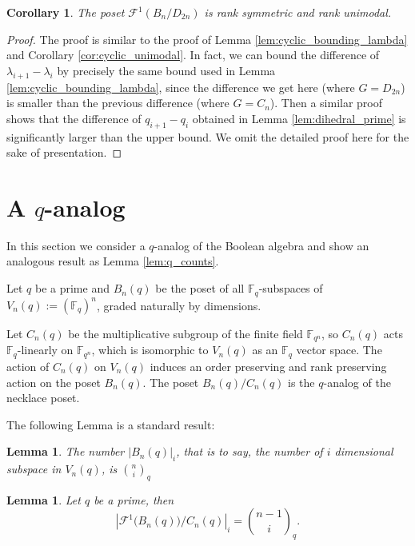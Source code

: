 \documentclass{amsart}
\newtheorem{cor}[thm]{Corollary}
\newtheorem{lem}[thm]{Lemma}
\theoremstyle{remark}
\newcommand\BF{{\mathbb F}}
\begin{document}
\begin{cor}{\label{dihedral003}} 
The poset $\mathcal F^1(B_n/D_{2n})$ is rank symmetric and rank unimodal.
\end{cor}

\begin{proof}
The proof is similar to the proof of Lemma \ref{lem:cyclic_bounding_lambda} and Corollary \ref{cor:cyclic_unimodal}. In fact, we can bound the difference of $\lambda_{i+1} - \lambda_i$ by precisely the same bound used in Lemma \ref{lem:cyclic_bounding_lambda}, since the difference we get here (where $G = D_{2n}$) is smaller than the previous difference (where $G= C_n$). Then a similar proof shows that the difference of $q_{i+1} - q_i$ obtained  in Lemma \ref{lem:dihedral_prime} is significantly larger than the upper bound. We omit the detailed proof here for the sake of presentation.
\end{proof}


\section{A $q$-analog}
\label{sec:q_analog}

In this section we consider a $q$-analog of the Boolean algebra and show an analogous result as Lemma \ref{lem:q_counts}. 

Let $q$ be a prime and $B_n(q)$ be the poset of all $\BF_q$-subspaces of $V_n(q) := (\BF_q)^n$, graded naturally by dimensions. 

Let $C_n(q)$ be the multiplicative subgroup of the finite field $\BF_{q^n}$, so $C_n(q)$ acts $\BF_q$-linearly on $\BF_{q^n}$, which is isomorphic to $V_n(q)$ as an $\BF_q$ vector space. The action of $C_n(q)$ on $V_n(q)$ induces an order preserving and rank preserving action on the poset $B_n(q)$. The poset $B_n(q)/C_n(q)$ is the $q$-analog of the necklace poset.  

The following Lemma is a standard result:

\begin{lem}
\label{q:number_subspaces}
The number $|B_n(q)|_i$, that is to say, the number of $i$ dimensional subspace in $V_n(q)$, is ${n \choose i}_q$
\end{lem}


\begin{lem} 

Let $q$ be a prime,  then $$ |\mathcal F^1 \big(B_n(q)\big)/C_n(q)|_{i} = {n-1 \choose i}_q.$$
\end{lem}
\end{document}
